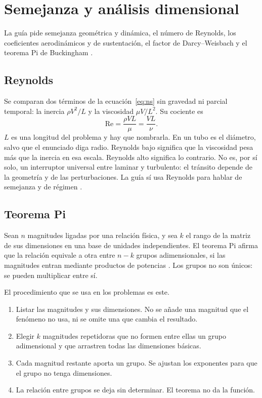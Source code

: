 \chapter{Semejanza y análisis dimensional}
\label{ch:semejanza}

La guía pide semejanza geométrica y dinámica, el número de Reynolds, los coeficientes aerodinámicos y de sustentación, el factor de Darcy--Weisbach y el teorema Pi de Buckingham \parencite{uleGuia2026}.

\section{Reynolds}

Se comparan dos términos de la ecuación~\eqref{eq:ns} sin gravedad ni parcial temporal: la inercia \(\rho V^2/L\) y la viscosidad \(\mu V/L^2\). Su cociente es
\begin{equation}
\label{eq:reynolds}
\mathrm{Re}=\frac{\rho V L}{\mu}=\frac{V L}{\nu}.
\end{equation}
 \(L\) es una longitud del problema y hay que nombrarla. En un tubo es el diámetro, salvo que el enunciado diga radio. Reynolds bajo significa que la viscosidad pesa más que la inercia en esa escala. Reynolds alto significa lo contrario. No es, por sí solo, un interruptor universal entre laminar y turbulento: el tránsito depende de la geometría y de las perturbaciones. La guía sí usa Reynolds para hablar de semejanza y de régimen \parencite{uleGuia2026}.

\section{Teorema Pi}

Sean \(n\) magnitudes ligadas por una relación física, y sea \(k\) el rango de la matriz de sus dimensiones en una base de unidades independientes. El teorema Pi afirma que la relación equivale a otra entre \(n-k\) grupos adimensionales, si las magnitudes entran mediante productos de potencias \parencite{uleGuia2026}. Los grupos no son únicos: se pueden multiplicar entre sí.

El procedimiento que se usa en los problemas es este.

\begin{enumerate}[leftmargin=1.4em]
\item Listar las magnitudes y sus dimensiones. No se añade una magnitud que el fenómeno no usa, ni se omite una que cambia el resultado.
\item Elegir \(k\) magnitudes repetidoras que no formen entre ellas un grupo adimensional y que arrastren todas las dimensiones básicas.
\item Cada magnitud restante aporta un grupo. Se ajustan los exponentes para que el grupo no tenga dimensiones.
\item La relación entre grupos se deja sin determinar. El teorema no da la función.
\end{enumerate}

